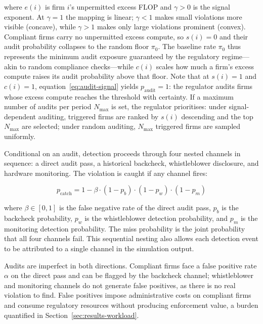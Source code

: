 where $e(i)$ is firm $i$'s unpermitted excess FLOP and $\gamma > 0$ is the signal exponent. At $\gamma = 1$ the mapping is linear; $\gamma < 1$ makes small violations more visible (concave), while $\gamma > 1$ makes only large violations prominent (convex). Compliant firms carry no unpermitted excess compute, so $s(i) = 0$ and their audit probability collapses to the random floor $\pi_0$. The baseline rate $\pi_0$ thus represents the minimum audit exposure guaranteed by the regulatory regime---akin to random compliance checks---while $c(i)$ scales how much a firm's excess compute raises its audit probability above that floor. Note that at $s(i) = 1$ and $c(i) = 1$, equation~\eqref{eq:audit-signal} yields $p_{\mathrm{audit}} = 1$: the regulator audits firms whose excess compute reaches the threshold with certainty. If a maximum number of audits per period $N_{\max}$ is set, the regulator prioritises: under signal-dependent auditing, triggered firms are ranked by $s(i)$ descending and the top $N_{\max}$ are selected; under random auditing, $N_{\max}$ triggered firms are sampled uniformly.

Conditional on an audit, detection proceeds through four nested channels in sequence: a direct audit pass, a historical backcheck, whistleblower disclosure, and hardware monitoring. The violation is caught if any channel fires:

\begin{equation}
p_{\mathrm{catch}} = 1 - \beta \cdot (1 - p_b) \cdot (1 - p_w) \cdot (1 - p_m)
\label{eq:catch}
\end{equation}

where $\beta \in [0,1]$ is the false negative rate of the direct audit pass, $p_b$ is the backcheck probability, $p_w$ is the whistleblower detection probability, and $p_m$ is the monitoring detection probability. The miss probability is the joint probability that all four channels fail. This sequential nesting also allows each detection event to be attributed to a single channel in the simulation output.

Audits are imperfect in both directions. Compliant firms face a false positive rate $\alpha$ on the direct pass and can be flagged by the backcheck channel; whistleblower and monitoring channels do not generate false positives, as there is no real violation to find. False positives impose administrative costs on compliant firms and consume regulatory resources without producing enforcement value, a burden quantified in Section~\ref{sec:results-workload}.


